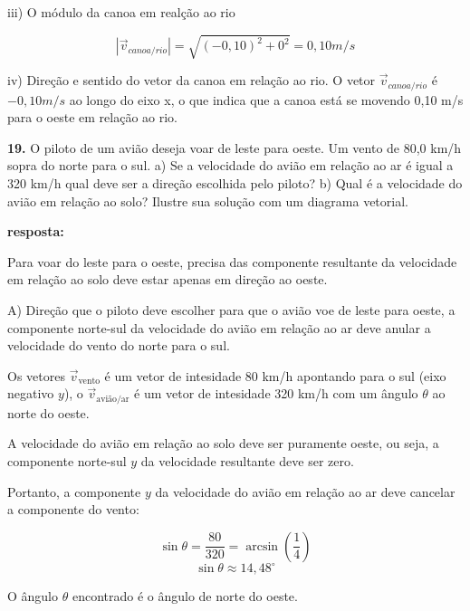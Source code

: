 \documentclass[a4paper, 12pt]{article}
\begin{document}
\begin{flushleft}
		iii) O módulo da canoa em realção ao rio
		
		\begin{equation*}
			|\vec{v}_{canoa/rio}| = \sqrt{(-0,10)^2 + 0^2} = 0,10m/s
		\end{equation*}
		
		iv) Direção e sentido do vetor da canoa em relação ao rio. O vetor $\vec{v}_{canoa/rio}$ é $-0,10m/s$ ao longo do eixo x, o que indica que a canoa está se movendo 0,10 m/s para o oeste em relação ao rio.
		
		\vspace{2em}
		
		\textbf{19.} O piloto de um avião deseja voar de leste para oeste. Um vento de 80,0 km/h sopra do norte para o sul. a) Se a velocidade do avião em relação ao ar é igual a 320 km/h qual deve ser a direção escolhida pelo piloto? b) Qual é a velocidade do avião em relação ao solo? Ilustre sua solução com um diagrama vetorial.
		
		\textbf{resposta:}		
			
			Para voar do leste para o oeste, precisa das componente resultante da velocidade em relação ao solo deve estar apenas em direção ao oeste.
			
			A) Direção que o piloto deve escolher para que o avião voe de leste para oeste, a componente norte-sul da velocidade do avião em relação ao ar deve anular a velocidade do vento do norte para o sul.
			
			Os vetores $\vec{v}_\text{vento}$ é um vetor de intesidade 80 km/h apontando para o sul (eixo negativo $y$), o $\vec{v}_\text{avião/ar}$ é um vetor de intesidade 320 km/h com um ângulo 
			$\theta$ ao norte do oeste.
			
			A velocidade do avião em relação ao solo deve ser puramente oeste, ou seja, a componente norte-sul $y$ da velocidade resultante deve ser zero.
			
			Portanto, a componente $y$ da velocidade do avião em relação ao ar deve cancelar a componente do vento:
			
			\begin{equation*}
				\sin{\theta} = \frac{80}{320} = \arcsin({\frac{1}{4}})			
			\end{equation*}
			\begin{equation*}
				\sin{\theta} \approx 14,48^\circ
			\end{equation*}
			
			O ângulo $\theta$ encontrado é o ângulo de norte do oeste.
			

\end{flushleft}
\end{document}
